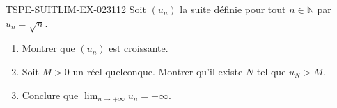 \begin{exercice}{TSPE-SUITLIM-EX-023}{1}{12}
Soit $(u_n)$ la suite définie pour tout $n \in \mathbb{N}$ par $u_n = \sqrt{n}$.
\begin{enumerate}
  \item Montrer que $(u_n)$ est croissante.
  \item Soit $M > 0$ un réel quelconque. Montrer qu'il existe $N$ tel que $u_N > M$.
  \item Conclure que $\lim_{n \to +\infty} u_n = +\infty$.
\end{enumerate}
\end{exercice}

